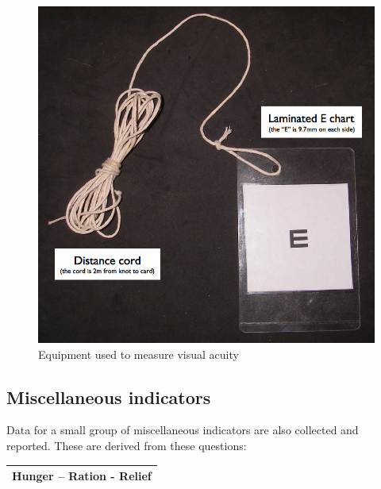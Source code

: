 \documentclass[12pt,a4paper]{book}
\theoremstyle{definition}
\theoremstyle{definition}
\theoremstyle{definition}
\theoremstyle{remark}
\begin{document}
\begin{figure}[H]

{\centering \includegraphics[width=800pt]{figures/indicators29} 

}

\caption{Equipment used to measure visual acuity}\label{fig:indicators29}
\end{figure}

\hypertarget{miscellaneous-indicators}{%
\subsection{Miscellaneous indicators}\label{miscellaneous-indicators}}

Data for a small group of miscellaneous indicators are also collected
and reported. These are derived from these questions:

\begin{longtable}[]{@{}c@{}}
\toprule
\begin{minipage}[t]{0.97\columnwidth}\centering
\textbf{Hunger -- Ration - Relief}\strut
\end{minipage}\tabularnewline
\bottomrule
\end{longtable}
\end{document}
